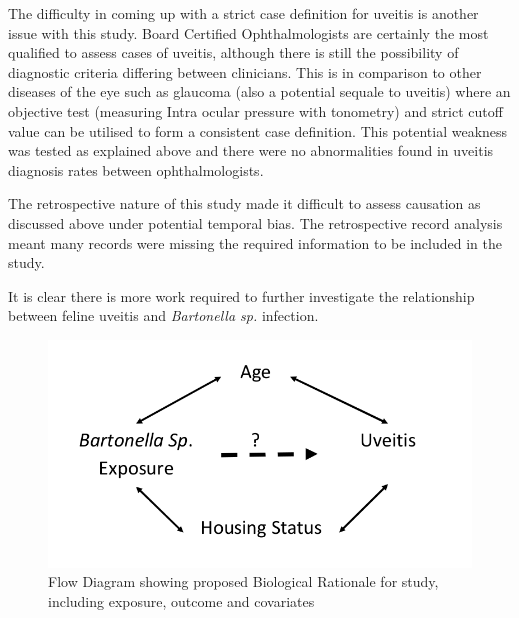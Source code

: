 \documentclass[11pt,twocolumn]{article}
\begin{document}
		
		The difficulty in coming up with a strict case definition for uveitis is another issue with this study. 
		Board Certified Ophthalmologists are certainly the most qualified to assess cases of uveitis, although there is still the possibility of diagnostic criteria differing between clinicians. 
		This is in comparison to other diseases of the eye such as glaucoma (also a potential sequale to uveitis) where an objective test (measuring Intra ocular pressure with tonometry) and strict cutoff value can be utilised to form a consistent case definition.
		This potential weakness was tested as explained above and there were no abnormalities found in uveitis diagnosis rates between ophthalmologists.


		The retrospective nature of this study made it difficult to assess causation as discussed above under potential temporal bias. The retrospective record analysis meant many records were missing the required information to be included in the study.

		
		It is clear there is more work required to further investigate the relationship between feline uveitis and \emph{Bartonella sp.} infection.
\newpage
\begin{figure}[h!]
	\centering
	\includegraphics[scale=0.4]{figure1.jpg}
	\caption{Flow Diagram showing proposed Biological Rationale for study, including exposure, outcome and covariates }
	\label{fig:1}
\end{figure}
\end{document}
